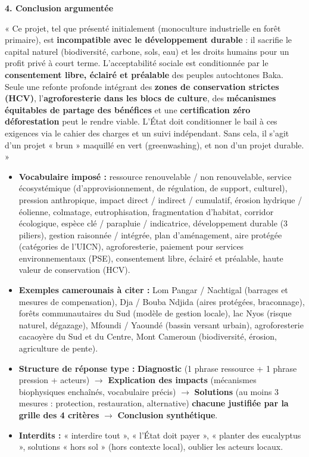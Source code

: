 \documentclass[11pt]{article}
\begin{document}
\begin{exoresolu}
\textbf{4. Conclusion argumentée}\par
« Ce projet, tel que présenté initialement (monoculture industrielle en forêt primaire), est \textbf{incompatible avec le développement durable} : il sacrifie le capital naturel (biodiversité, carbone, sols, eau) et les droits humains pour un profit privé à court terme. L'acceptabilité sociale est conditionnée par le \textbf{consentement libre, éclairé et préalable} des peuples autochtones Baka. Seule une refonte profonde intégrant des \textbf{zones de conservation strictes (HCV)}, l'\textbf{agroforesterie dans les blocs de culture}, des \textbf{mécanismes équitables de partage des bénéfices} et une \textbf{certification zéro déforestation} peut le rendre viable. L'État doit conditionner le bail à ces exigences via le cahier des charges et un suivi indépendant. Sans cela, il s'agit d'un projet « brun » maquillé en vert (greenwashing), et non d'un projet durable. »
\end{exoresolu}

\begin{aretenir}
\begin{itemize}
    \item \textbf{Vocabulaire imposé :} ressource renouvelable / non renouvelable, service écosystémique (d'approvisionnement, de régulation, de support, culturel), pression anthropique, impact direct / indirect / cumulatif, érosion hydrique / éolienne, colmatage, eutrophisation, fragmentation d'habitat, corridor écologique, espèce clé / parapluie / indicatrice, développement durable (3 piliers), gestion raisonnée / intégrée, plan d'aménagement, aire protégée (catégories de l'UICN), agroforesterie, paiement pour services environnementaux (PSE), consentement libre, éclairé et préalable, haute valeur de conservation (HCV).
    \item \textbf{Exemples camerounais à citer :} Lom Pangar / Nachtigal (barrages et mesures de compensation), Dja / Bouba Ndjida (aires protégées, braconnage), forêts communautaires du Sud (modèle de gestion locale), lac Nyos (risque naturel, dégazage), Mfoundi / Yaoundé (bassin versant urbain), agroforesterie cacaoyère du Sud et du Centre, Mont Cameroun (biodiversité, érosion, agriculture de pente).
    \item \textbf{Structure de réponse type :} \textbf{Diagnostic} (1 phrase ressource + 1 phrase pression + acteurs) $\rightarrow$ \textbf{Explication des impacts} (mécanismes biophysiques enchaînés, vocabulaire précis) $\rightarrow$ \textbf{Solutions} (au moins 3 mesures : protection, restauration, alternative) \textbf{chacune justifiée par la grille des 4 critères} $\rightarrow$ \textbf{Conclusion synthétique}.
    \item \textbf{Interdits :} « interdire tout », « l'État doit payer », « planter des eucalyptus », solutions « hors sol » (hors contexte local), oublier les acteurs locaux.
\end{itemize}
\end{aretenir}
\end{document}
